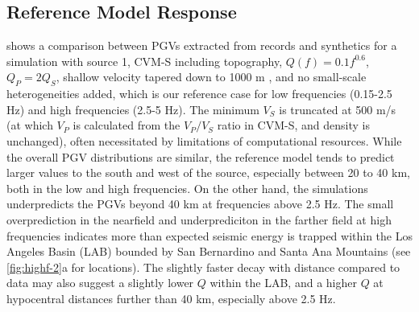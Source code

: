 \subsection{Reference Model Response}
 shows a comparison between PGVs extracted from records and synthetics for a simulation with source 1, CVM-S including topography, $Q(f)=0.1f^{0.6}$, $Q_P=2Q_S$, shallow velocity tapered down to 1000 m \citep{huCalibrationNearsurfaceSeismic2021}, and no small-scale heterogeneities added, which is our reference case for low frequencies (0.15-2.5 Hz) and high frequencies (2.5-5 Hz). The minimum $V_S$ is truncated at 500 m/s (at which $V_P$ is calculated from the $V_P/V_S$ ratio in CVM-S, and density is unchanged), often necessitated by limitations of computational resources. While the overall PGV distributions are similar, the reference model tends to predict larger values to the south and west of the source, especially between 20 to 40 km, both in the low and high frequencies. On the other hand, the simulations underpredicts the PGVs beyond 40 km at frequencies above 2.5 Hz. The small overprediction in the nearfield and underprediciton in the farther field at high frequencies indicates more than expected seismic energy is trapped within the Los Angeles Basin (LAB) bounded by San Bernardino and Santa Ana Mountains (see \cref{fig:highf-2}a for locations). The slightly faster decay with distance compared to data may also suggest a slightly lower $Q$ within the LAB, and a higher $Q$ at hypocentral distances further than 40 km, especially above 2.5 Hz.

